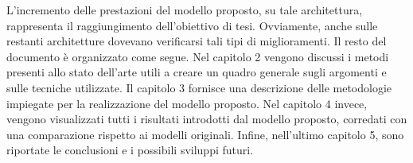 L'incremento delle prestazioni del modello proposto, su tale architettura, rappresenta il raggiungimento dell'obiettivo di tesi. Ovviamente, anche sulle restanti architetture dovevano verificarsi tali tipi di miglioramenti. Il resto del documento è organizzato come segue. Nel capitolo 2 vengono discussi i metodi presenti allo stato dell'arte utili a creare un quadro generale sugli argomenti e sulle tecniche utilizzate. Il capitolo 3 fornisce una descrizione delle metodologie impiegate per la realizzazione del modello proposto. Nel capitolo 4 invece, vengono visualizzati tutti i risultati introdotti dal modello proposto, corredati con una comparazione rispetto ai modelli originali. Infine, nell'ultimo capitolo 5, sono riportate le conclusioni e i possibili sviluppi futuri. 